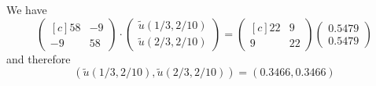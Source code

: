 \begin{loesung}
\begin{teilaufgaben}
We have
\[
\begin{pmatrix*}[c]
58 & -9 \\
  -9 & 58
\end{pmatrix*}
\cdot
\begin{pmatrix}
\tilde u(1/3,2/10)  \\
\tilde u(2/3,2/10) 
\end{pmatrix}
=
\begin{pmatrix*}[c]
22 & 9 \\
 9 & 22
\end{pmatrix*}
\begin{pmatrix}
 0.5479  \\
 0.5479
\end{pmatrix}
\]
and therefore
\begin{equation}
(\tilde u(1/3,2/10), \tilde u(2/3,2/10)) = (0.3466, 0.3466)
\tag{\bf 1P}
\end{equation}
\end{teilaufgaben}
\end{loesung}

